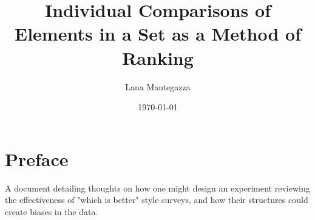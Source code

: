 \documentclass[12pt]{book}
\theoremstyle{definitionstyle}
\numberwithin{equation}{section}
\begin{document}

\title{Individual Comparisons of Elements in a Set as a Method of Ranking}
\author{Lana Mantegazza}
\date{\today}
\maketitle
\newpage
\setcounter{page}{1}



\chapter*{Preface}
A document detailing thoughts on how one might design an experiment reviewing the effectiveness of "which is better" style surveys, and how their structures could create biases in the data.
\\


\newpage
\setcounter{page}{1}

\tableofcontents
\end{document}
